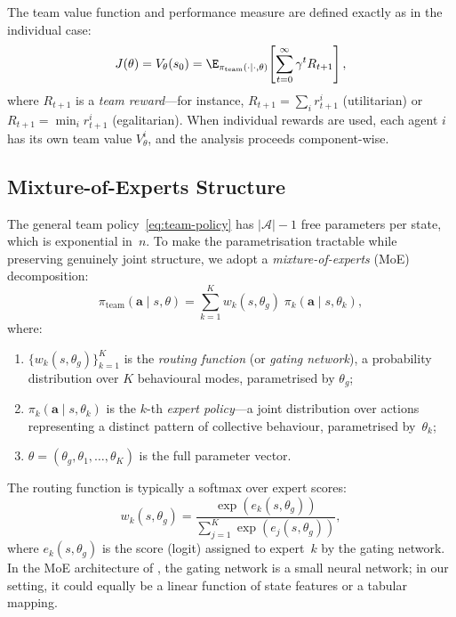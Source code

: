 The team value function and performance measure are defined exactly as in the individual case:
\begin{equation}\label{eq:team-value}
  J(\theta) = V_\theta(s_0) = \E_{\pi_{\mathrm{team}}(\cdot\mid\cdot,\theta)}\!\left[\sum_{t=0}^\infty \gamma^t R_{t+1}\right],
\end{equation}
where $R_{t+1}$ is a \emph{team reward}---for instance, $R_{t+1}=\sum_i r_{t+1}^i$ (utilitarian) or $R_{t+1}=\min_i r_{t+1}^i$ (egalitarian). When individual rewards are used, each agent $i$ has its own team value $V_\theta^i$, and the analysis proceeds component-wise.

\subsection{Mixture-of-Experts Structure}
\label{subsec:moe-structure}

The general team policy~\eqref{eq:team-policy} has $|\bm{\mathcal{A}}|-1$ free parameters per state, which is exponential in~$n$. To make the parametrisation tractable while preserving genuinely joint structure, we adopt a \emph{mixture-of-experts} (MoE) decomposition:
\begin{equation}\label{eq:moe-team-policy}
  \pi_{\mathrm{team}}(\bm{a}\mid s,\theta) = \sum_{k=1}^K w_k(s,\theta_g)\;\pi_k(\bm{a}\mid s,\theta_k),
\end{equation}
where:
\begin{enumerate}[label=(\roman*)]
  \item $\{w_k(s,\theta_g)\}_{k=1}^K$ is the \emph{routing function} (or \emph{gating network}), a probability distribution over $K$ behavioural modes, parametrised by $\theta_g$;
  \item $\pi_k(\bm{a}\mid s,\theta_k)$ is the $k$-th \emph{expert policy}---a joint distribution over actions representing a distinct pattern of collective behaviour, parametrised by~$\theta_k$;
  \item $\theta=(\theta_g,\theta_1,\ldots,\theta_K)$ is the full parameter vector.
\end{enumerate}

The routing function is typically a softmax over expert scores:
\begin{equation}\label{eq:routing}
  w_k(s,\theta_g) = \frac{\exp(e_k(s,\theta_g))}{\sum_{j=1}^K \exp(e_j(s,\theta_g))},
\end{equation}
where $e_k(s,\theta_g)$ is the score (logit) assigned to expert~$k$ by the gating network. In the MoE architecture of \cite{shazeer2017}, the gating network is a small neural network; in our setting, it could equally be a linear function of state features or a tabular mapping.

